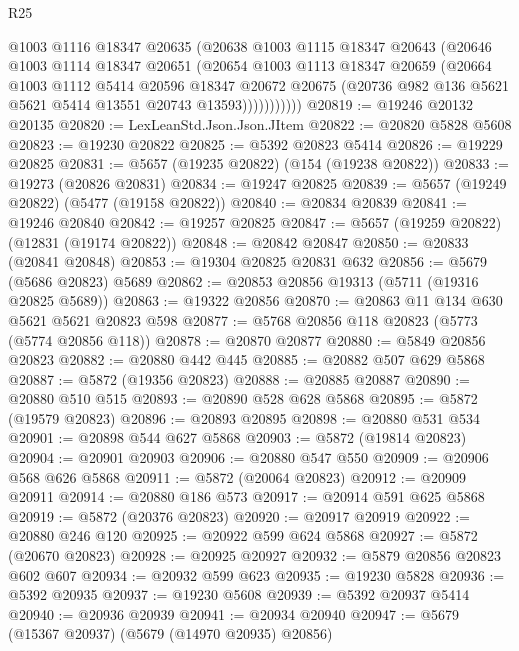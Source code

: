 \begin{lexlean}{R25}
\begin{coremodule}
                @1003
                @1116
                @18347
                @20635
                (@20638
                  @1003
                  @1115
                  @18347
                  @20643
                  (@20646
                    @1003
                    @1114
                    @18347
                    @20651
                    (@20654
                      @1003
                      @1113
                      @18347
                      @20659
                      (@20664
                        @1003
                        @1112
                        @5414
                        @20596
                        @18347
                        @20672
                        @20675
                        (@20736 @982 @136 @5621 @5621 @5414 @13551 @20743 @13593)))))))))))
@20819 := @19246 @20132 @20135
@20820 := LexLeanStd.Json.Json.JItem
@20822 := @20820 @5828 @5608
@20823 := @19230 @20822
@20825 := @5392 @20823 @5414
@20826 := @19229 @20825
@20831 := @5657 (@19235 @20822) (@154 (@19238 @20822))
@20833 := @19273 (@20826 @20831)
@20834 := @19247 @20825
@20839 := @5657 (@19249 @20822) (@5477 (@19158 @20822))
@20840 := @20834 @20839
@20841 := @19246 @20840
@20842 := @19257 @20825
@20847 := @5657 (@19259 @20822) (@12831 (@19174 @20822))
@20848 := @20842 @20847
@20850 := @20833 (@20841 @20848)
@20853 := @19304 @20825 @20831 @632
@20856 := @5679 (@5686 @20823) @5689
@20862 := @20853 @20856 @19313 (@5711 (@19316 @20825 @5689))
@20863 := @19322 @20856
@20870 := @20863 @11 @134 @630 @5621 @5621 @20823 @598
@20877 := @5768 @20856 @118 @20823 (@5773 (@5774 @20856 @118))
@20878 := @20870 @20877
@20880 := @5849 @20856 @20823
@20882 := @20880 @442 @445
@20885 := @20882 @507 @629 @5868
@20887 := @5872 (@19356 @20823)
@20888 := @20885 @20887
@20890 := @20880 @510 @515
@20893 := @20890 @528 @628 @5868
@20895 := @5872 (@19579 @20823)
@20896 := @20893 @20895
@20898 := @20880 @531 @534
@20901 := @20898 @544 @627 @5868
@20903 := @5872 (@19814 @20823)
@20904 := @20901 @20903
@20906 := @20880 @547 @550
@20909 := @20906 @568 @626 @5868
@20911 := @5872 (@20064 @20823)
@20912 := @20909 @20911
@20914 := @20880 @186 @573
@20917 := @20914 @591 @625 @5868
@20919 := @5872 (@20376 @20823)
@20920 := @20917 @20919
@20922 := @20880 @246 @120
@20925 := @20922 @599 @624 @5868
@20927 := @5872 (@20670 @20823)
@20928 := @20925 @20927
@20932 := @5879 @20856 @20823 @602 @607
@20934 := @20932 @599 @623
@20935 := @19230 @5828
@20936 := @5392 @20935
@20937 := @19230 @5608
@20939 := @5392 @20937 @5414
@20940 := @20936 @20939
@20941 := @20934 @20940
@20947 := @5679 (@15367 @20937) (@5679 (@14970 @20935) @20856)

\end{coremodule}
\end{lexlean}
